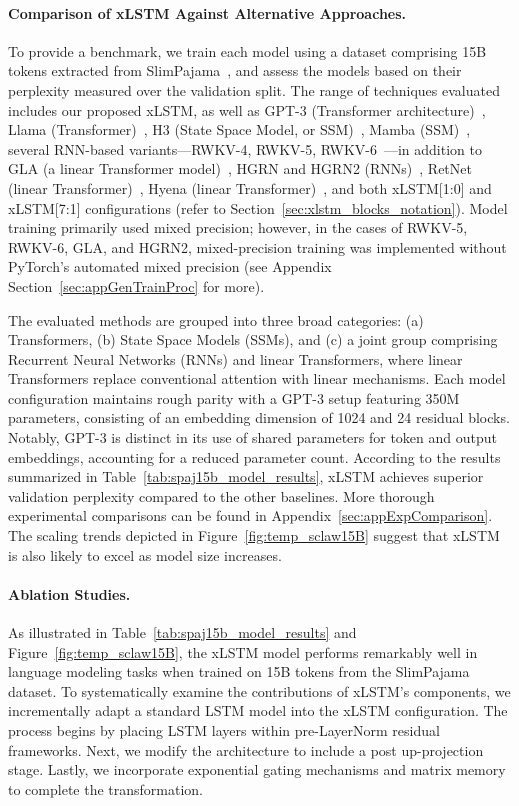 \paragraph{Comparison of xLSTM Against Alternative Approaches.} To provide a benchmark, we train each model using a dataset comprising 15B tokens extracted from SlimPajama~\citep{Soboleva:23}, and assess the models based on their perplexity measured over the validation split. The range of techniques evaluated includes our proposed xLSTM, as well as GPT-3 (Transformer architecture)~\citep{Brown:20short}, Llama (Transformer)~\citep{Touvron:23arxiv}, H3 (State Space Model, or SSM)~\citep{Fu:23}, Mamba (SSM)~\citep{Gu:24arxiv}, several RNN-based variants—RWKV-4, RWKV-5, RWKV-6~\citep{Peng:23arxivshort,Peng:24arxivshort}—in addition to GLA (a linear Transformer model)~\citep{Yang:23arxiv}, HGRN and HGRN2 (RNNs)~\citep{Qin:23,Qin:24arxiv}, RetNet (linear Transformer)~\citep{Sun:23arxiv}, Hyena (linear Transformer)~\citep{Poli:23}, and both xLSTM[1:0] and xLSTM[7:1] configurations (refer to Section~\ref{sec:xlstm_blocks_notation}). Model training primarily used mixed precision; however, in the cases of RWKV-5, RWKV-6, GLA, and HGRN2, mixed-precision training was implemented without PyTorch's automated mixed precision (see Appendix Section~\ref{sec:appGenTrainProc} for more). 

The evaluated methods are grouped into three broad categories: (a) Transformers, (b) State Space Models (SSMs), and (c) a joint group comprising Recurrent Neural Networks (RNNs) and linear Transformers, where linear Transformers replace conventional attention with linear mechanisms. Each model configuration maintains rough parity with a GPT-3 setup featuring 350M parameters, consisting of an embedding dimension of 1024 and 24 residual blocks. Notably, GPT-3 is distinct in its use of shared parameters for token and output embeddings, accounting for a reduced parameter count. According to the results summarized in Table~\ref{tab:spaj15b_model_results}, xLSTM achieves superior validation perplexity compared to the other baselines. More thorough experimental comparisons can be found in Appendix~\ref{sec:appExpComparison}. The scaling trends depicted in Figure~\ref{fig:temp_sclaw15B} suggest that xLSTM is also likely to excel as model size increases.

\paragraph{Ablation Studies.}
As illustrated in Table~\ref{tab:spaj15b_model_results} and Figure~\ref{fig:temp_sclaw15B}, the xLSTM model performs remarkably well in language modeling tasks when trained on 15B tokens from the SlimPajama dataset. To systematically examine the contributions of xLSTM's components, we incrementally adapt a standard LSTM model into the xLSTM configuration. The process begins by placing LSTM layers within pre-LayerNorm residual frameworks. Next, we modify the architecture to include a post up-projection stage. Lastly, we incorporate exponential gating mechanisms and matrix memory to complete the transformation.

